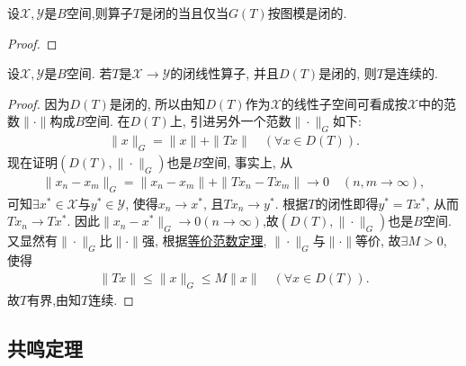 \documentclass[../../main.tex]{subfiles}%
\begin{document}
\begin{proposition}
设$\mathscr{X},\mathscr{Y}$是$B$空间,则算子$T$是闭的当且仅当$G(T)$按图模是闭的.
\end{proposition}
\begin{proof}


\end{proof}

\begin{theorem}[闭图像定理]\label{theorem:泛函分析--闭图像定理}
设$\mathscr{X},\mathscr{Y}$是$B$空间. 若$T$是$\mathscr{X}\to\mathscr{Y}$的闭线性算子, 并且$D(T)$是闭的, 则$T$是连续的.
\end{theorem}
\begin{proof}

因为$D(T)$是闭的, 所以由知$D(T)$作为$\mathscr{X}$的线性子空间可看成按$\mathscr{X}$中的范数$\|\cdot\|$构成$B$空间. 在$D(T)$上, 引进另外一个范数$\|\cdot\|_G$如下:
\begin{align*}
\|x\|_G = \|x\| + \|Tx\| \quad (\forall x\in D(T)).
\end{align*}
现在证明$(D(T),\|\cdot\|_G)$也是$B$空间, 事实上, 从
\begin{align*}
\|x_n - x_m\|_G = \|x_n - x_m\| + \|Tx_n - Tx_m\| \to 0 \quad (n,m\to\infty),
\end{align*}
可知$\exists x^*\in\mathscr{X}$与$y^*\in\mathscr{Y}$, 使得$x_n\to x^*$, 且$Tx_n\to y^*$. 根据$T$的闭性即得$y^* = Tx^*$, 从而$Tx_n\to Tx^*$. 因此$\|x_n - x^*\|_G\to 0(n\to \infty)$,故$(D(T),\|\cdot\|_G)$也是$B$空间.
又显然有$\|\cdot\|_G$比$\|\cdot\|$强, 根据\hyperref[corollary:泛函分析--等价范数定理]{等价范数定理}, $\|\cdot\|_G$与$\|\cdot\|$等价, 故$\exists M>0$, 使得
\begin{align*}
\|Tx\| \leqslant \|x\|_G \leqslant M\|x\| \quad (\forall x\in D(T)).
\end{align*}
故$T$有界,由知$T$连续.

\end{proof}


\subsection{共鸣定理}
\end{document}
